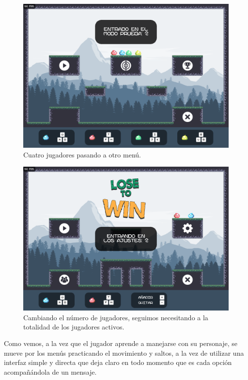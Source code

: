 \documentclass[12pt, spanish]{article}
\begin{document}
\begin{figure}[H]
  \centering
	\includegraphics[width=\textwidth]{"interfaz/esperando_practicar.png"}
  \caption{Cuatro jugadores pasando a otro menú.}\label{figure:esperando_practicar}
\end{figure}

\begin{figure}[H]
  \centering
	\includegraphics[width=\textwidth]{"interfaz/menu_funciona_num_jugadores.png"}
  \caption{Cambiando el número de jugadores, seguimos necesitando a la totalidad de los jugadores activos.}\label{figure:menu_funciona_num_jugadores}
\end{figure}

Como vemos, a la vez que el jugador aprende a manejarse con su personaje, se mueve por los menús practicando el movimiento y saltos, a la vez de utilizar una interfaz simple y directa que deja claro en todo momento que es cada opción acompañándola de un mensaje.
\end{document}
